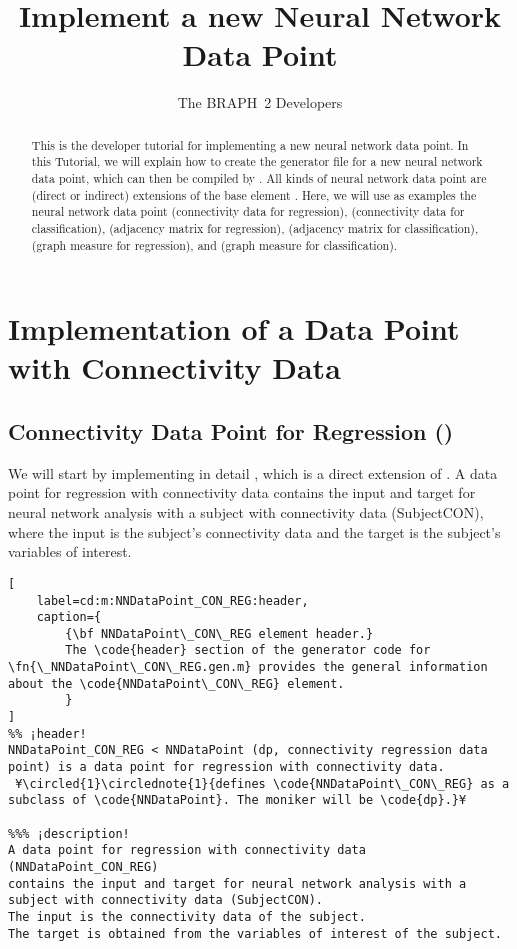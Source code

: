\documentclass{tufte-handout}
\title{Implement a new Neural Network Data Point}
\author[The BRAPH~2 Developers]{The BRAPH~2 Developers}
\begin{document}
\maketitle

\begin{abstract}
\noindent
This is the developer tutorial for implementing a new neural network data point. 
In this Tutorial, we will explain how to create the generator file  for a new neural network data point, which can then be compiled by . All kinds of neural network data point are (direct or indirect) extensions of the base element . Here, we will use as examples the neural network data point  (connectivity data for regression),  (connectivity data for classification),  (adjacency matrix for regression),  (adjacency matrix for classification),  (graph measure for regression), and  (graph measure for classification).
\end{abstract}

\tableofcontents

\clearpage
\section{Implementation of a Data Point with Connectivity Data}

\subsection{Connectivity Data Point for Regression ()}

We will start by implementing in detail , which is a direct extension of .
A data point for regression with connectivity data  contains the input and target for neural network analysis with a subject with connectivity data (SubjectCON), where the input is the subject's connectivity data and the target is the subject's variables of interest.

\begin{lstlisting}[
	label=cd:m:NNDataPoint_CON_REG:header,
	caption={
		{\bf NNDataPoint\_CON\_REG element header.}
		The \code{header} section of the generator code for \fn{\_NNDataPoint\_CON\_REG.gen.m} provides the general information about the \code{NNDataPoint\_CON\_REG} element.
		}
]
%% ¡header!
NNDataPoint_CON_REG < NNDataPoint (dp, connectivity regression data point) is a data point for regression with connectivity data.
 ¥\circled{1}\circlednote{1}{defines \code{NNDataPoint\_CON\_REG} as a subclass of \code{NNDataPoint}. The moniker will be \code{dp}.}¥

%%% ¡description!
A data point for regression with connectivity data (NNDataPoint_CON_REG) 
contains the input and target for neural network analysis with a subject with connectivity data (SubjectCON).
The input is the connectivity data of the subject.
The target is obtained from the variables of interest of the subject.
\end{lstlisting}
\end{document}
